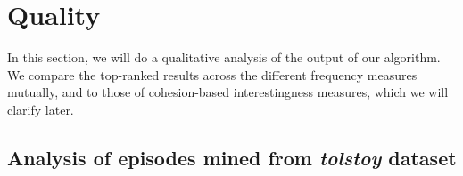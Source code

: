 \section{Quality}

In this section, we will do a qualitative analysis of the output of our algorithm. We compare the top-ranked results across the different frequency measures mutually, and to those of cohesion-based interestingness measures, which we will clarify later.

\iffalse
\subsection{Comparing the frequency measures on a toy example}

We consider the example sequence of the example in Figure~\ref{fig:event-sequence}, which was used as an example throughout chapter~\ref{sec:problem-statement}. A small sequence is interesting to analyze because we have a full overview of the dataset, and can therefore provide insight into how the frequency and confidence values came to be. Also, it is possible to generate all episodes that cover the sequence for a certain window size, using a low frequency threshold.

We'll generate all episodes using all of the frequency measures we implemented.
\fi


\subsection{Analysis of episodes mined from \emph{tolstoy} dataset}
\label{sec:experiments-quality-episodes}

